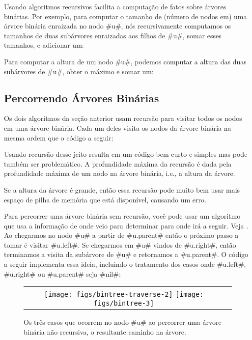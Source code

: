 %
Usando algoritmos recursivos facilita a computação de fatos sobre árvores 
binárias. Por exemplo, para computar o tamanho de (número de nodos em)
uma árvore binária enraizada no nodo #u#, nós recursivamente computamos
os tamanhos de duas subárvores enraizadas aos filhos de #u#, somar esses tamanhos, e adicionar um:


Para computar a altura de um nodo 
#u#, podemos computar a altura das duas subárvores de #u#, obter o máximo e somar um:


\subsection{Percorrendo Árvores Binárias}

%
%
%
Os dois algoritmos da seção anterior usam recursão para visitar
todos os nodos em uma árvore binária. Cada um deles visita os nodos
da árvore binária na mesma ordem que o código a seguir:

Usando recursão desse jeito resulta em um código bem curto e simples mas
pode também ser problemático. A profundidade máxima da recursão é dada
pela profundidade máxima de um nodo na árvore binária, i.e., a altura
da árvore.

Se a altura da árvore é grande, então essa recursão pode muito bem usar 
mais espaço de pilha de memória que está disponível, causando um erro.

Para percorrer uma árvore binária sem recursão, você pode usar um algoritmo 
que usa a informação de onde veio para determinar para onde irá a seguir.
Veja .  
Ao chegarmos no nodo #u# a partir de #u.parent# então o próximo passo
a tomar é visitar #u.left#. Se chegarmos em #u# vindos de #u.right#, então
terminamos a visita da subárvore de #u# e retornamos a #u.parent#.
O código a seguir implementa essa ideia, incluindo o tratamento dos
casos onde #u.left#, #u.right# ou #u.parent# seja #nil#:

\begin{figure}
  \begin{center}
    \begin{tabular}{cc}
      \texttt{[image: figs/bintree-traverse-2]}
      \texttt{[image: figs/bintree-3]}
    \end{tabular}
  \end{center}
  \caption[Percorrendo uma BinaryTree]{Os três casos que ocorrem no nodo #u# ao percorrer uma árvore binária não recursiva, o resultante caminho na árvore.}
\end{figure}

